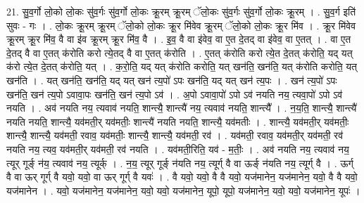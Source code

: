 \documentclass[17pt]{extarticle}
\begin{document}
21. सु॒व॒र्गो लो॒को लो॒कः सु॑व॒र्गः सु॑व॒र्गो लो॒कः क्रू॒रम् क्रू॒रम् ॅलो॒कः सु॑व॒र्गः सु॑व॒र्गो लो॒कः क्रू॒रम् । . सु॒व॒र्ग इति॑ सुवः - गः । . लो॒कः क्रू॒रम् क्रू॒रम् ॅलो॒को लो॒कः क्रू॒र मि॑वेव क्रू॒रम् ॅलो॒को लो॒कः क्रू॒र मि॑व । . क्रू॒र मि॑वेव क्रू॒रम् क्रू॒र मि॑व॒ वै वा इ॑व क्रू॒रम् क्रू॒र मि॑व॒ वै । . इ॒व॒ वै वा इ॑वेव॒ वा ए॒त दे॒तद् वा इ॑वेव॒ वा ए॒तत् । . वा ए॒त दे॒तद् वै वा ए॒तत् क॑रोति करो त्ये॒तद् वै वा ए॒तत् क॑रोति । . ए॒तत् क॑रोति करो त्ये॒त दे॒तत् क॑रोति॒ यद् यत् क॑रो त्ये॒त दे॒तत् क॑रोति॒ यत् । . क॒रो॒ति॒ यद् यत् क॑रोति करोति॒ यत् खन॑ति॒ खन॑ति॒ यत् क॑रोति करोति॒ यत् खन॑ति । . यत् खन॑ति॒ खन॑ति॒ यद् यत् खन॑ त्य॒पो॑ ऽपः खन॑ति॒ यद् यत् खन॑ त्य॒पः । . खन॑ त्य॒पो॑ ऽपः खन॑ति॒ खन॑ त्य॒पो ऽवावा॒पः खन॑ति॒ खन॑ त्य॒पो ऽव॑ । . अ॒पो ऽवावा॒पो॑ ऽपो ऽव॑ नयति नय॒ त्यवा॒पो॑ ऽपो ऽव॑ नयति । . अव॑ नयति नय॒ त्यवाव॑ नयति॒ शान्त्यै॒ शान्त्यै॑ नय॒ त्यवाव॑ नयति॒ शान्त्यै᳚ । . न॒य॒ति॒ शान्त्यै॒ शान्त्यै॑ नयति नयति॒ शान्त्यै॒ यव॑मती॒र् यव॑मतीः॒ शान्त्यै॑ नयति नयति॒ शान्त्यै॒ यव॑मतीः । . शान्त्यै॒ यव॑मती॒र् यव॑मतीः॒ शान्त्यै॒ शान्त्यै॒ यव॑मती॒ रवाव॒ यव॑मतीः॒ शान्त्यै॒ शान्त्यै॒ यव॑मती॒ रव॑ । . यव॑मती॒ रवाव॒ यव॑मती॒र् यव॑मती॒ रव॑ नयति नय॒ त्यव॒ यव॑मती॒र् यव॑मती॒ रव॑ नयति । . यव॑मती॒रिति॒ यव॑ - म॒तीः॒ । . अव॑ नयति नय॒ त्यवाव॑ नय॒ त्यूर् गूर्ङ् न॑य॒ त्यवाव॑ नय॒ त्यूर्क् । . न॒य॒ त्यूर् गूर्ङ् न॑यति नय॒ त्यूर्ग् वै वा ऊर्ङ् न॑यति नय॒ त्यूर्ग् वै । . ऊर्ग् वै वा ऊर् गूर्ग् वै यवो॒ यवो॒ वा ऊर् गूर्ग् वै यवः॑ । . वै यवो॒ यवो॒ वै वै यवो॒ यज॑मानेन॒ यज॑मानेन॒ यवो॒ वै वै यवो॒ यज॑मानेन । . यवो॒ यज॑मानेन॒ यज॑मानेन॒ यवो॒ यवो॒ यज॑मानेन॒ यूपो॒ यूपो॒ यज॑मानेन॒ यवो॒ यवो॒ यज॑मानेन॒ यूपः॑ । \newline
\end{document}
